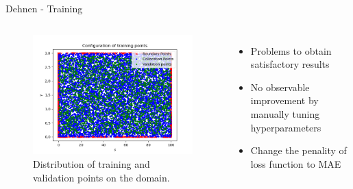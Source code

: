 \begin{frame}{Dehnen - Training}
    \begin{columns}
        \column{\moit} \begin{figure}
            \centering
            \includegraphics[width=\textwidth]{imgs/training-points-dehnen.png}
            \caption{Distribution of training and validation points on the domain.}
            \label{fig:training-points-dehnen}
        \end{figure}
        \column{\moit} \begin{itemize}
            \item Problems to obtain satisfactory results
            \item No observable improvement by manually tuning hyperparameters
            \item Change the penality of loss function to MAE
        \end{itemize}
    \end{columns}
\end{frame}



